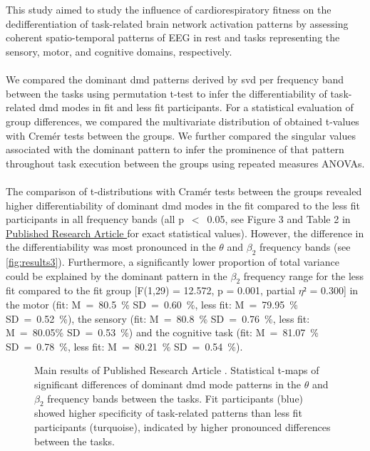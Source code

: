 \hyperref[pub:paperIII]{}\\
\\
This study aimed to study the influence of cardiorespiratory fitness on the dedifferentiation of task-related brain network activation patterns by assessing coherent spatio-temporal patterns of EEG in rest and tasks representing the sensory, motor, and cognitive domains, respectively.\\
\\
We compared the dominant \gls{dmd} patterns derived by \gls{svd} per frequency band between the tasks using permutation t-test to infer the differentiability of task-related \gls{dmd} modes in fit and less fit participants. For a statistical evaluation of group differences, we compared the multivariate distribution of obtained t-values with Cremér tests between the groups. We further compared the singular values associated with the dominant pattern to infer the prominence of that pattern throughout task execution between the groups using repeated measures ANOVAs.\\
\\
The comparison of t-distributions with Cramér tests between the groups revealed higher differentiability of dominant \gls{dmd} modes in the fit compared to the less fit participants in all frequency bands (all p~$<$~0.05, see Figure 3 and Table 2 in \hyperref[pub:paperIII]{Published Research Article } for exact statistical values). However, the difference in the differentiability was most pronounced in the $\theta$ and $\beta_2$ frequency bands (see \autoref{fig:results3}). Furthermore, a significantly lower proportion of total variance could be explained by the dominant pattern in the $\beta_2$ frequency range for the less fit compared to the fit group [F(1,29) = 12.572, p = 0.001, partial $\eta²$ = 0.300] in the motor (fit: M~=~80.5~\% SD~=~0.60~\%, less fit: M~=~79.95~\% SD~=~0.52~\%), the sensory (fit: M~=~80.8~\% SD~=~0.76~\%, less fit: M~=~80.05\% SD~=~0.53~\%) and the cognitive task (fit: M~=~81.07~\% SD~=~0.78~\%, less fit: M~=~80.21~\% SD~=~0.54~\%).\\

\begin{figure}[ht]
    \centering
    
    \caption[Main results of Published Research Article ]{Main results of Published Research Article . Statistical t-maps of significant differences of dominant \gls{dmd} mode patterns in the $\theta$ and $\beta_2$ frequency bands between the tasks. Fit participants (blue) showed higher specificity of task-related patterns than less fit participants (turquoise), indicated by higher pronounced differences between the tasks.}
    \label{fig:results3}
\end{figure}


